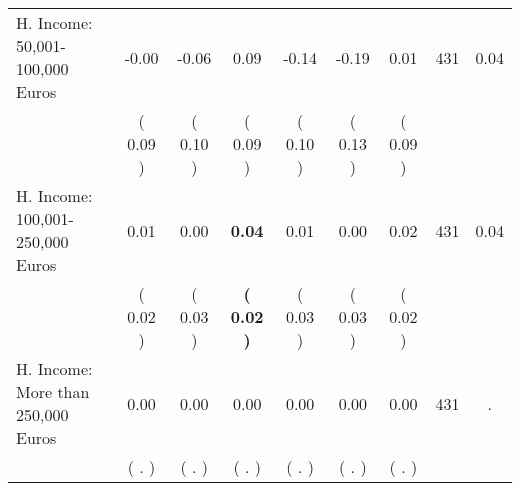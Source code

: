 \begin{tabular}{lcccccccc}
H. Income: 50,001-100,000 Euros &     -0.00 &     -0.06 &      0.09 &     -0.14 &     -0.19 &      0.01 & 431 &       0.04 \\ 
 & (     0.09 ) & (     0.10 ) & (     0.09 ) & (     0.10 ) & (     0.13 ) & (     0.09 ) & \\
H. Income: 100,001-250,000 Euros &      0.01 &      0.00 & \textbf{     0.04} &      0.01 &      0.00 &      0.02 & 431 &       0.04 \\ 
 & (     0.02 ) & (     0.03 ) & \textbf{(     0.02 )} & (     0.03 ) & (     0.03 ) & (     0.02 ) & \\
H. Income: More than 250,000 Euros &      0.00 &      0.00 &      0.00 &      0.00 &      0.00 &      0.00 & 431 &          . \\ 
 & (        . ) & (        . ) & (        . ) & (        . ) & (        . ) & (        . ) & \\
\bottomrule
\end{tabular}
